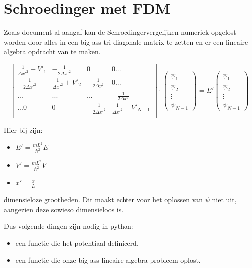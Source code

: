 \documentclass[11pt]{article}
\providecommand{\tightlist}{%
      \setlength{\itemsep}{0pt}\setlength{\parskip}{0pt}}
\begin{document}
    \hypertarget{schroedinger-met-fdm}{%
\section{Schroedinger met FDM}\label{schroedinger-met-fdm}}

Zoals document al aangaf kan de Schroedingervergelijken numeriek
opgelost worden door alles in een big ass tri-diagonale matrix te zetten
en er een lineaire algebra opdracht van te maken.

\[
\begin{bmatrix}
\frac{1}{\Delta x'^2}+V'_1 & -\frac{1}{2 \Delta x'^2} &   0 & 0...\\
-\frac{1}{2 \Delta x'^2} & \frac{1}{\Delta x'^2}+V'_2 & -\frac{1}{2 \Delta y^2} & 0... \\
...& ... & ... & -\frac{1}{2 \Delta x^2}\\
...0 & 0 & -\frac{1}{2 \Delta x'^2} & \frac{1}{\Delta x'^2}+V'_{N-1}\\
\end{bmatrix} \cdot \begin{pmatrix}
\psi_1\\
\psi_2\\
\vdots\\
\psi_{N-1}
\end{pmatrix} = E' \begin{pmatrix}
\psi_1\\
\psi_2\\
\vdots\\
\psi_{N-1}
\end{pmatrix}
\]

Hier bij zijn:

\begin{itemize}
\tightlist
\item
  \(E' = \frac{m L^2}{\hbar^2} E\)
\item
  \(V' = \frac{m L^2}{\hbar^2} V\)
\item
  \(x' = \frac{x}{L}\)
\end{itemize}

dimensieloze grootheden. Dit maakt echter voor het oplossen van \(\psi\)
niet uit, aangezien deze sowieso dimensieloos is.

Dus volgende dingen zijn nodig in python:

\begin{itemize}
\tightlist
\item
  een functie die het potentiaal definieerd.
\item
  een functie die onze big ass lineaire algebra probleem oplost.
\end{itemize}
\end{document}
